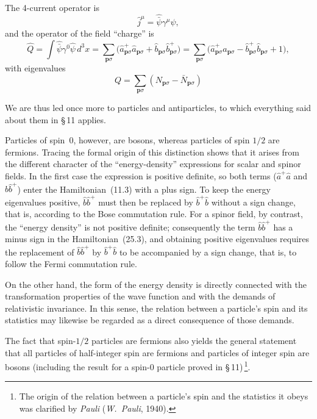 The 4-current operator is
\begin{equation}
\widehat j^\mu = \widehat{\bar\psi}\gamma^\mu\widehat\psi,
\tag{25.7}
\end{equation}
and the operator of the field ``charge'' is
\begin{equation}
\widehat Q = \int \widehat{\bar\psi}\gamma^0\widehat\psi\,d^3x = \sum_{\mathbf{p}\sigma}\bigl(\widehat a^+_{\mathbf{p}\sigma}\widehat a_{\mathbf{p}\sigma} + \widehat b_{\mathbf{p}\sigma}\widehat b^+_{\mathbf{p}\sigma}\bigr) = \sum_{\mathbf{p}\sigma}\bigl(\widehat a^+_{\mathbf{p}\sigma}\widehat a_{\mathbf{p}\sigma} - \widehat b^+_{\mathbf{p}\sigma}\widehat b_{\mathbf{p}\sigma} + 1\bigr),
\tag{25.8}
\end{equation}
with eigenvalues
\begin{equation}
Q = \sum_{\mathbf{p}\sigma}(N_{\mathbf{p}\sigma} - \bar N_{\mathbf{p}\sigma})
\tag{25.9}
\end{equation}

We are thus led once more to particles and antiparticles, to which everything said about them in \S\,11 applies.

Particles of spin~0, however, are bosons, whereas particles of spin $1/2$ are fermions. Tracing the formal origin of this distinction shows that it arises from the different character of the ``energy-density'' expressions for scalar and spinor fields. In the first case the expression is positive definite, so both terms ($\widehat a^+\widehat a$ and $\widehat b\widehat b^+$) enter the Hamiltonian~(11.3) with a plus sign. To keep the energy eigenvalues positive, $\widehat b\widehat b^+$ must then be replaced by $\widehat b^+\widehat b$ without a sign change, that is, according to the Bose commutation rule. For a spinor field, by contrast, the ``energy density'' is not positive definite; consequently the term $\widehat b\widehat b^+$ has a minus sign in the Hamiltonian~(25.3), and obtaining positive eigenvalues requires the replacement of $\widehat b\widehat b^+$ by $\widehat b^+\widehat b$ to be accompanied by a sign change, that is, to follow the Fermi commutation rule.

On the other hand, the form of the energy density is directly connected with the transformation properties of the wave function and with the demands of relativistic invariance. In this sense, the relation between a particle's spin and its statistics may likewise be regarded as a direct consequence of those demands.

The fact that spin-$1/2$ particles are fermions also yields the general statement that all particles of half-integer spin are fermions and particles of integer spin are bosons (including the result for a spin-0 particle proved in \S\,11)\,\footnote{The origin of the relation between a particle's spin and the statistics it obeys was clarified by \emph{Pauli} (\emph{W.~Pauli}, 1940).}.

